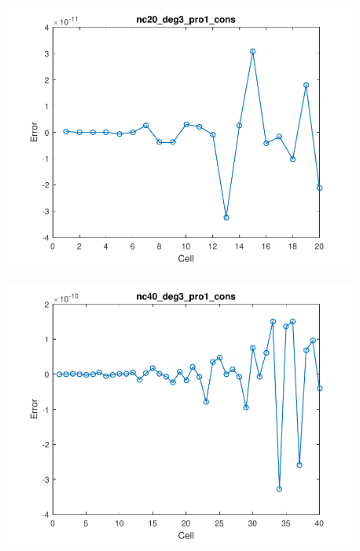 \documentclass[11pt,a4paper]{article}
\theoremstyle{plain}
\theoremstyle{definition}
\begin{document}
\begin{figure}[H]
\begin{subfigure}[b]{0.48\textwidth}
\includegraphics[width=\linewidth]{../../tests_01_01/test_01_01_test47_pro1_cons/output/plots/nc20_deg3_wei111_pro1_cons.pdf}
\end{subfigure}\hspace*{\fill}
\begin{subfigure}[b]{0.48\textwidth}
\includegraphics[width=\linewidth]{../../tests_01_01/test_01_01_test47_pro1_cons/output/plots/nc40_deg3_wei111_pro1_cons.pdf}
\end{subfigure}


\end{figure}
\end{document}

